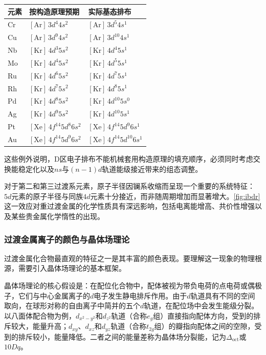 \documentclass[UTF8]{ctexbook}
\begin{document}
\medskip
\renewcommand{\arraystretch}{1.15}
\noindent\begin{tabular*}{\textwidth}{@{\extracolsep{\fill}}lll@{}}
\toprule
元素 & 按构造原理预期 & 实际基态排布 \\
\midrule
Cr & $[\mathrm{Ar}]\,3d^4 4s^2$ & $[\mathrm{Ar}]\,3d^5 4s^1$ \\
Cu & $[\mathrm{Ar}]\,3d^9 4s^2$ & $[\mathrm{Ar}]\,3d^{10} 4s^1$ \\
Nb & $[\mathrm{Kr}]\,4d^3 5s^2$ & $[\mathrm{Kr}]\,4d^4 5s^1$ \\
Mo & $[\mathrm{Kr}]\,4d^4 5s^2$ & $[\mathrm{Kr}]\,4d^5 5s^1$ \\
Ru & $[\mathrm{Kr}]\,4d^6 5s^2$ & $[\mathrm{Kr}]\,4d^7 5s^1$ \\
Rh & $[\mathrm{Kr}]\,4d^7 5s^2$ & $[\mathrm{Kr}]\,4d^8 5s^1$ \\
Pd & $[\mathrm{Kr}]\,4d^8 5s^2$ & $[\mathrm{Kr}]\,4d^{10} 5s^0$ \\
Ag & $[\mathrm{Kr}]\,4d^9 5s^2$ & $[\mathrm{Kr}]\,4d^{10} 5s^1$ \\
Pt & $[\mathrm{Xe}]\,4f^{14}5d^8 6s^2$ & $[\mathrm{Xe}]\,4f^{14}5d^9 6s^1$ \\
Au & $[\mathrm{Xe}]\,4f^{14}5d^9 6s^2$ & $[\mathrm{Xe}]\,4f^{14}5d^{10} 6s^1$ \\
\bottomrule
\end{tabular*}
\renewcommand{\arraystretch}{1.0}

这些例外说明，D区电子排布不能机械套用构造原理的填充顺序，必须同时考虑交换能稳定化以及$ns$与$(n-1)d$轨道能级接近带来的组态调整。

对于第二和第三过渡系元素，原子半径因镧系收缩而呈现一个重要的系统特征：$5d$元素的原子半径与同族$4d$元素十分接近，而非随周期增加而显著增大。\ref{fig:ibdr}这一效应对重过渡金属的化学性质具有深远影响，包括电离能增高、共价性增强以及某些贵金属化学惰性的出现。

\subsubsection{过渡金属离子的颜色与晶体场理论}

过渡金属化合物最直观的特征之一是其丰富的颜色表现。要理解这一现象的物理根源，需要引入晶体场理论的基本框架。

晶体场理论的核心假设是：在配位化合物中，配体被视为带负电荷的点电荷或偶极子，它们与中心金属离子的$d$电子发生静电排斥作用。由于$d$轨道具有不同的空间取向，在球形对称的自由离子中简并的五个$d$轨道，在配位场中会发生能级分裂。以八面体配合物为例，$d_{x^2-y^2}$和$d_{z^2}$轨道（合称$e_g$组）直接指向配体方向，受到的排斥较大，能量升高；$d_{xy}$、$d_{xz}$和$d_{yz}$轨道（合称$t_{2g}$组）的瓣指向配体之间的空隙，受到的排斥较小，能量降低。二者之间的能量差称为晶体场分裂能，记为$\Delta_{\mathrm{oct}}$或$10Dq$。
\end{document}
